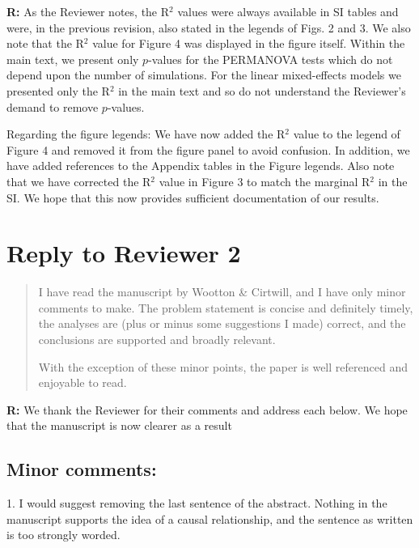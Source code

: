 \documentclass[12pt]{article}
\begin{document}
      \textbf{R:} As the Reviewer notes, the R$^2$ values were always available in SI tables and were, in the previous revision, also stated in the legends of Figs. 2 and 3. We also note that the R$^2$ value for Figure 4 was displayed in the figure itself. Within the main text, we present only $p$-values for the PERMANOVA tests which do not depend upon the number of simulations. For the linear mixed-effects models we presented only the R$^2$ in the main text and so do not understand the Reviewer's demand to remove $p$-values.


      Regarding the figure legends: We have now added the R$^2$ value to the legend of Figure 4 and removed it from the figure panel to avoid confusion. In addition, we have added references to the Appendix tables in the Figure legends. Also note that we have corrected the R$^2$ value in Figure 3 to match the marginal R$^2$ in the SI. We hope that this now provides sufficient documentation of our results.



\clearpage

\section*{Reply to Reviewer 2}

  \begin{quotation}
    I have read the manuscript by Wootton \& Cirtwill, and I have only minor comments to make. The problem statement is concise and definitely timely, the analyses are (plus or minus some suggestions I made) correct, and the conclusions are supported and broadly relevant.

    With the exception of these minor points, the paper is well referenced and enjoyable to read.
  \end{quotation}  

  \smallskip

  \textbf{R:} We thank the Reviewer for their comments and address each below. We hope that the manuscript is now clearer as a result

  \smallskip

  \subsection*{Minor comments:}

    1. I would suggest removing the last sentence of the abstract. Nothing in the manuscript supports the idea of a causal relationship, and the sentence as written is too strongly worded.
\end{document}
